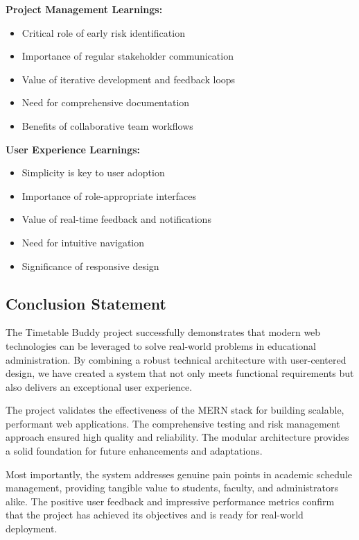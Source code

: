 \textbf{Project Management Learnings:}
\begin{itemize}
    \item Critical role of early risk identification
    \item Importance of regular stakeholder communication
    \item Value of iterative development and feedback loops
    \item Need for comprehensive documentation
    \item Benefits of collaborative team workflows
\end{itemize}

\textbf{User Experience Learnings:}
\begin{itemize}
    \item Simplicity is key to user adoption
    \item Importance of role-appropriate interfaces
    \item Value of real-time feedback and notifications
    \item Need for intuitive navigation
    \item Significance of responsive design
\end{itemize}

\subsection{Conclusion Statement}

The Timetable Buddy project successfully demonstrates that modern web technologies can be leveraged to solve real-world problems in educational administration. By combining a robust technical architecture with user-centered design, we have created a system that not only meets functional requirements but also delivers an exceptional user experience.

The project validates the effectiveness of the MERN stack for building scalable, performant web applications. The comprehensive testing and risk management approach ensured high quality and reliability. The modular architecture provides a solid foundation for future enhancements and adaptations.

Most importantly, the system addresses genuine pain points in academic schedule management, providing tangible value to students, faculty, and administrators alike. The positive user feedback and impressive performance metrics confirm that the project has achieved its objectives and is ready for real-world deployment.


